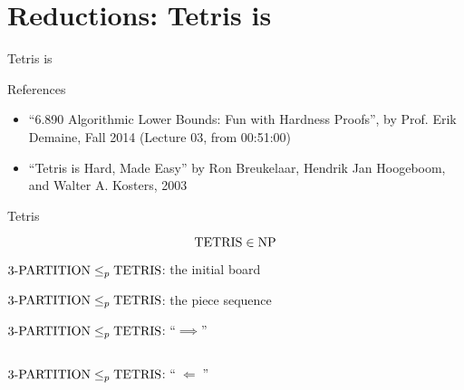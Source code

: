 \section{Reductions: Tetris is \npc{}}

\begin{frame}{Tetris is \npc{}}
  \begin{alertblock}{References}
	\begin{itemize}
	  \item ``6.890 Algorithmic Lower Bounds: Fun with Hardness Proofs'',
	  	by Prof. Erik Demaine, Fall 2014 (Lecture 03, from 00:51:00)
	  \item ``Tetris is Hard, Made Easy'' by Ron Breukelaar, Hendrik Jan Hoogeboom, and Walter A. Kosters, 2003
	\end{itemize}
  \end{alertblock}
\end{frame}
\begin{frame}{Tetris}
\end{frame}
\begin{frame}{\tetris}
  \begin{definition}
  \end{definition}

  \[
	\text{TETRIS} \in \text{NP}
  \]
\end{frame}
\begin{frame}{\partition}
  \begin{definition}[\partition]
  \end{definition}
\end{frame}
\begin{frame}{$\text{3-PARTITION} \le_{p} \text{TETRIS}$: the initial board}
\end{frame}
\begin{frame}{$\text{3-PARTITION} \le_{p} \text{TETRIS}$: the piece sequence}
\end{frame}
\begin{frame}{$\text{3-PARTITION} \le_{p} \text{TETRIS}$: ``$\implies$''}
  \begin{columns}
  \end{columns}
\end{frame}
\begin{frame}{$\text{3-PARTITION} \le_{p} \text{TETRIS}$: ``$\;\Longleftarrow\;$''}
\end{frame}
